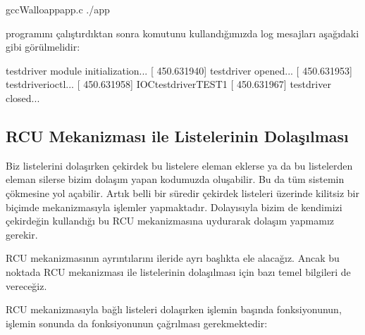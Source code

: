\documentclass[a4paper,10pt,turkish]{sphinxmanual}
\begin{document}
\begin{sphinxVerbatim}[commandchars=\\\{\}]
\PYGZdl{}gcc\PYGZhy{}Wall\PYGZhy{}oappapp.c
\PYGZdl{}./app
\end{sphinxVerbatim}

\sphinxAtStartPar
{} programını çalıştırdıktan sonra  komutunu kullandığımızda log mesajları aşağıdaki gibi
görülmelidir:

\begin{sphinxVerbatim}[commandchars=\\\{\}]
[  431.787375] test\PYGZhy{}driver module initialization...
[  450.631940] test\PYGZhy{}driver opened...
[  450.631953] test\PYGZus{}driver\PYGZus{}ioctl...
[  450.631958] IOC\PYGZus{}test\PYGZus{}driver\PYGZus{}TEST1
[  450.631967] test\PYGZhy{}driver closed...
\end{sphinxVerbatim}


\subsection{RCU Mekanizması ile  Listelerinin Dolaşılması}
\label{\detokenize{processcontrolblock:rcu-mekanizmasi-ile-task-struct-listelerinin-dolasilmasi}}
\sphinxAtStartPar
Biz  listelerini dolaşırken çekirdek bu listelere eleman eklerse ya da bu listelerden
eleman silerse bizim dolaşım yapan kodumuzda  oluşabilir.
Bu da tüm sistemin çökmesine yol açabilir. Artık belli bir süredir çekirdek  listeleri
üzerinde kilitsiz bir biçimde  mekanizmasıyla işlemler yapmaktadır. Dolayısıyla
bizim de kendimizi çekirdeğin kullandığı bu RCU mekanizmasına uydurarak dolaşım yapmamız gerekir.

\sphinxAtStartPar
RCU mekanizmasının ayrıntılarını ileride ayrı başlıkta ele alacağız. Ancak bu noktada RCU mekanizması
ile  listelerinin dolaşılması için bazı temel bilgileri de vereceğiz.

\sphinxAtStartPar
RCU mekanizmasıyla bağlı listeleri dolaşırken işlemin başında  fonksiyonunun, işlemin
sonunda da  fonksiyonunun çağrılması gerekmektedir:
\end{document}
